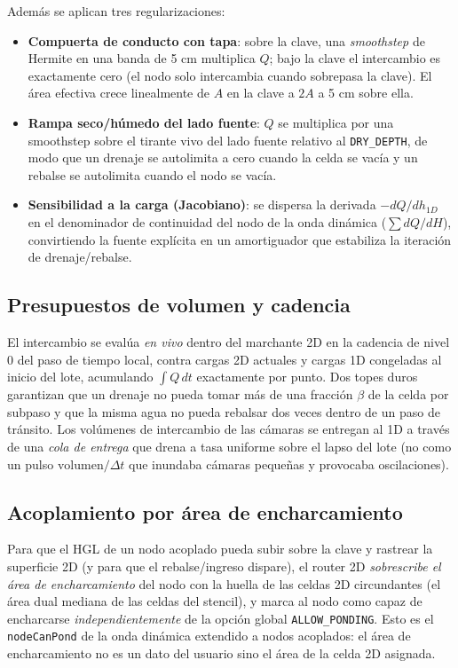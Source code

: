 \documentclass[11pt,a4paper]{article}
\begin{document}
Además se aplican tres regularizaciones:
\begin{itemize}[nosep]
  \item \textbf{Compuerta de conducto con tapa}: sobre la clave, una
        \emph{smoothstep} de Hermite en una banda de 5 cm multiplica $Q$; bajo
        la clave el intercambio es exactamente cero (el nodo solo intercambia
        cuando sobrepasa la clave). El área efectiva crece linealmente de $A$
        en la clave a $2A$ a 5 cm sobre ella.
  \item \textbf{Rampa seco/húmedo del lado fuente}: $Q$ se multiplica por una
        smoothstep sobre el tirante vivo del lado fuente relativo al
        \texttt{DRY\_DEPTH}, de modo que un drenaje se autolimita a cero cuando
        la celda se vacía y un rebalse se autolimita cuando el nodo se vacía.
  \item \textbf{Sensibilidad a la carga (Jacobiano)}: se dispersa la derivada
        $-dQ/dh_{1D}$ en el denominador de continuidad del nodo de la onda
        dinámica ($\sum dQ/dH$), convirtiendo la fuente explícita en un
        amortiguador que estabiliza la iteración de drenaje/rebalse.
\end{itemize}

\subsection{Presupuestos de volumen y cadencia}

El intercambio se evalúa \emph{en vivo} dentro del marchante 2D en la cadencia
de nivel 0 del paso de tiempo local, contra cargas 2D actuales y cargas 1D
congeladas al inicio del lote, acumulando $\int Q\,dt$ exactamente por punto.
Dos topes duros garantizan que un drenaje no pueda tomar más de una fracción
$\beta$ de la celda por subpaso y que la misma agua no pueda rebalsar dos veces
dentro de un paso de tránsito. Los volúmenes de intercambio de las cámaras se
entregan al 1D a través de una \emph{cola de entrega} que drena a tasa uniforme
sobre el lapso del lote (no como un pulso $\mathrm{volumen}/\Delta t$ que
inundaba cámaras pequeñas y provocaba oscilaciones).

\subsection{Acoplamiento por área de encharcamiento}

Para que el HGL de un nodo acoplado pueda subir sobre la clave y rastrear la
superficie 2D (y para que el rebalse/ingreso dispare), el router 2D
\emph{sobrescribe el área de encharcamiento} del nodo con la huella de las
celdas 2D circundantes (el área dual mediana de las celdas del stencil), y
marca al nodo como capaz de encharcarse \emph{independientemente} de la opción
global \texttt{ALLOW\_PONDING}. Esto es el \texttt{nodeCanPond} de la onda
dinámica extendido a nodos acoplados: el área de encharcamiento no es un dato
del usuario sino el área de la celda 2D asignada.
\end{document}
